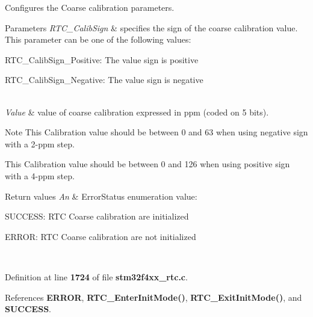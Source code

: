 Configures the Coarse calibration parameters. 


\begin{DoxyParams}{Parameters}
{\em R\+T\+C\+\_\+\+Calib\+Sign} & specifies the sign of the coarse calibration value. This parameter can be one of the following values\+: \begin{DoxyItemize}
\item R\+T\+C\+\_\+\+Calib\+Sign\+\_\+\+Positive\+: The value sign is positive \item R\+T\+C\+\_\+\+Calib\+Sign\+\_\+\+Negative\+: The value sign is negative \end{DoxyItemize}
\\
\hline
{\em Value} & value of coarse calibration expressed in ppm (coded on 5 bits).\\
\hline
\end{DoxyParams}
\begin{DoxyNote}{Note}
This Calibration value should be between 0 and 63 when using negative sign with a 2-\/ppm step.

This Calibration value should be between 0 and 126 when using positive sign with a 4-\/ppm step.
\end{DoxyNote}

\begin{DoxyRetVals}{Return values}
{\em An} & Error\+Status enumeration value\+:
\begin{DoxyItemize}
\item S\+U\+C\+C\+E\+SS\+: R\+TC Coarse calibration are initialized
\item E\+R\+R\+OR\+: R\+TC Coarse calibration are not initialized 
\end{DoxyItemize}\\
\hline
\end{DoxyRetVals}


Definition at line \textbf{ 1724} of file \textbf{ stm32f4xx\+\_\+rtc.\+c}.



References \textbf{ E\+R\+R\+OR}, \textbf{ R\+T\+C\+\_\+\+Enter\+Init\+Mode()}, \textbf{ R\+T\+C\+\_\+\+Exit\+Init\+Mode()}, and \textbf{ S\+U\+C\+C\+E\+SS}.


